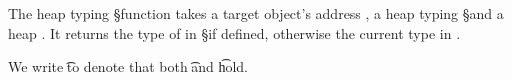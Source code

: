 \documentclass[a4paper,USenglish]{tex/lipics-v2016}
\begin{document}
\begin{mathpar}
\end{mathpar}

The heap typing \htype\a\S\s function takes a target object's address \a, a
heap typing \S and a heap \s. It returns the type of \a in \S if defined,
otherwise the current type in \s.

\begin{mathpar}

\end{mathpar}


We write \t\EQ\tp to denote that both \StrSub{}\K\t\tp and
\StrSub{}\K\tp\t hold.


\newcommand{\dmeet}[2]{#1\overset{\rightharpoonup}{\sqcap}#2}
\begin{mathpar}




\end{mathpar}

\hrulefill

\begin{mathpar}

\end{mathpar}
\end{document}
